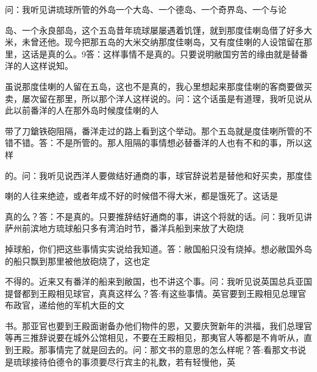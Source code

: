 问：我听见讲琉球所管的外岛一个大岛、一个德岛、一个奇界岛、一个与论

岛、一个永良部岛，这个五岛昔年琉球屡屡遇着饥馑，就到那度佳喇岛借了好多大米，未曾还他。现今把那五岛的大米交纳那度佳喇岛，又有度佳喇的人设馆留在那里，这话是真的么。9答：这样事情不是真的。只要说明敝国穷苦的缘由就是替番洋的人这样说知。

虽说那度佳喇的人留在五岛，这也不是真的，我心里想起来那度佳喇的客商要做买卖，屡次留在那里，所以那个洋人这样说的。问：这个话虽是有道理，我听见说从此以前番洋的人在那外岛时候度佳喇的人

带了刀鎗铁砲阻隔，番洋走过的路上看到这个举动。那个五岛就是度佳喇所管的不错不错。答：不是所管的。那人阻隔的事情想必替番洋的人也有不和的事，所以这样

的。问：我听见说西洋人要做结好通商的事，球官辞说若是替他和好买卖，那度佳

喇的人往来绝迹，或者年成不好的时候借不得大米，都是饿死了。这话是

\vfill
\begin{BookNotes}
\end{BookNotes}

真的么？答：不是真的。只要推辞结好通商的事，讲这个将就的话。问：我听见讲萨州前滨地方琉球船只多有湾泊时节，番洋兵船到来放了大砲烧

掉球船，你们把这些事情实实说给我知道。答：敝国船只没有烧掉。想必敝国外岛的船只飘到那里被他放砲烧了，这也定

不得的。近来又有番洋的船来到敝国，也不讲这个事。问：我听见说英国总兵亚国提督都到王殿相见球官，真真这样么？答:有这些事情。英官要到王殿相见总理官布政官，递给他的军机大臣的文

书。那亚官也要到王殿面谢备办他们物件的恩，又要庆贺新年的洪福，我们总理官等再三推辞说要在城外公馆相见，不要在王殿相见，那夷官人等都是不肯听从，直到王殿。那事情完了就是回去的。问：那文书的意思的怎么样呢？答:看那文书说是琉球接待伯德令的事须要尽行宾主的礼数，若有轻慢他，英

